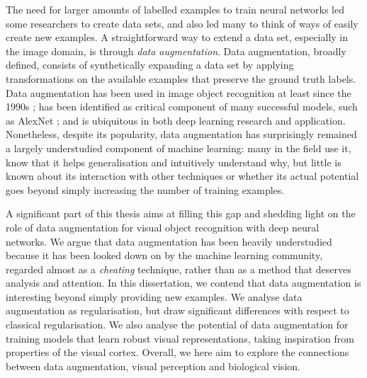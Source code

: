 {The need for larger amounts of labelled examples to train neural networks led some researchers to create data sets, and also led many to think of ways of easily create new examples. A straightforward way to extend a data set, especially in the image domain, is through \textit{data augmentation}. Data augmentation, broadly defined, consists of synthetically expanding a data set by applying transformations on the available examples that preserve the ground truth labels. Data augmentation has been used in image object recognition at least since the 1990s \citep{abumostafa1990hints, simard1992daug}; has been identified as critical component of many successful models, such as AlexNet \citep{krizhevsky2012alexnet}; and is ubiquitous in both deep learning research and application. Nonetheless, despite its popularity, data augmentation has surprisingly remained a largely understudied component of machine learning: many in the field use it, know that it helps generalisation and intuitively understand why, but little is known about its interaction with other techniques or whether its actual potential goes beyond simply increasing the number of training examples.

A significant part of this thesis aims at filling this gap and shedding light on the role of data augmentation for visual object recognition with deep neural networks. We argue that data augmentation has been heavily understudied because it has been looked down on by the machine learning community, regarded almost as a \textit{cheating} technique, rather than as a method that deserves analysis and attention. In this dissertation, we contend that data augmentation is interesting beyond simply providing new examples. We analyse data augmentation as regularisation, but draw significant differences with respect to classical regularisation. We also analyse the potential of data augmentation for training models that learn robust visual representations, taking inspiration from properties of the visual cortex. Overall, we here aim to explore the connections between data augmentation, visual perception and biological vision.

}
